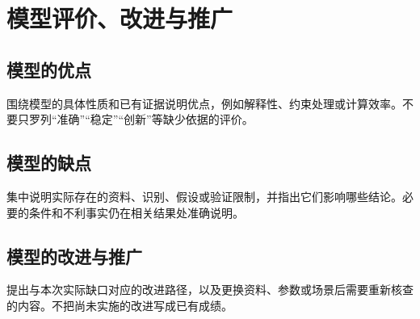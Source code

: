 \FloatBarrier
\section{模型评价、改进与推广}
\subsection{模型的优点}
围绕模型的具体性质和已有证据说明优点，例如解释性、约束处理或计算效率。不要只罗列“准确”“稳定”“创新”等缺少依据的评价。

\subsection{模型的缺点}
集中说明实际存在的资料、识别、假设或验证限制，并指出它们影响哪些结论。必要的条件和不利事实仍在相关结果处准确说明。

\subsection{模型的改进与推广}
提出与本次实际缺口对应的改进路径，以及更换资料、参数或场景后需要重新核查的内容。不把尚未实施的改进写成已有成绩。
\FloatBarrier
